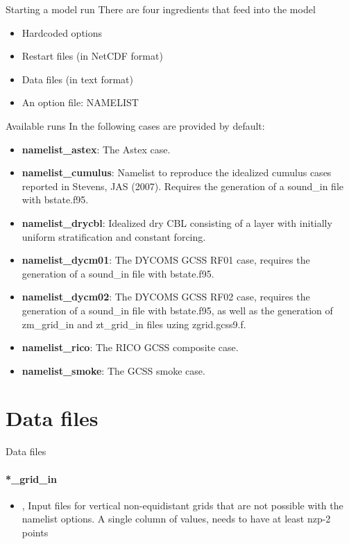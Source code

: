 \author{Thijs Heus}
\begin{frame}{Starting a model run}
There are four ingredients that feed into the model
\begin{itemize}
 \item Hardcoded options
 \item Restart files (in NetCDF format)
 \item Data files (in text format)
 \item An option file: NAMELIST
\end{itemize}
\end{frame}

\begin{frame}[allowframebreaks]{Available runs}
 In  the following cases are provided by default:

\begin{itemize}
\item \textbf{namelist\_astex}: The Astex case.
\item \textbf{namelist\_cumulus}: Namelist to reproduce the idealized
cumulus cases reported in Stevens, JAS (2007). Requires the
generation of a sound\_in file with bstate.f95.
\item \textbf{namelist\_drycbl}: Idealized dry CBL consisting of a
layer with initially uniform stratification and constant forcing.
\item \textbf{namelist\_dycm01}: The DYCOMS GCSS RF01 case, requires
the generation of a sound\_in file with bstate.f95.
\item \textbf{namelist\_dycm02}: The DYCOMS GCSS RF02 case, requires
the generation of a sound\_in file with bstate.f95, as well as the
generation of zm\_grid\_in and zt\_grid\_in files uzing zgrid.gcss9.f.
\item \textbf{namelist\_rico}: The RICO GCSS composite case.
\item \textbf{namelist\_smoke}: The GCSS smoke case.
\end{itemize}
\end{frame}

\section{Data files}
\begin{frame}{Data files}
\framesubtitle{*\_grid\_in}
\begin{itemize}
 \item {},  Input files for vertical non-equidistant grids that are not possible with the namelist options. A single column of values, needs to have at least nzp-2 points
\end{itemize}

\end{frame}


